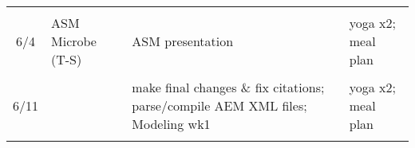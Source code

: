\documentclass[]{article}
\begin{document}
\begin{longtable}[]{@{}clll@{}}
\begin{minipage}[t]{0.24\columnwidth}
\strut
\end{minipage} & \begin{minipage}[t]{0.33\columnwidth}\raggedright\strut
\strut
\end{minipage} & \begin{minipage}[t]{0.28\columnwidth}\raggedright\strut
\strut
\end{minipage}\tabularnewline
\begin{minipage}[t]{0.04\columnwidth}\centering\strut
6/4\strut
\end{minipage} & \begin{minipage}[t]{0.24\columnwidth}\raggedright\strut
ASM Microbe (T-S)\strut
\end{minipage} & \begin{minipage}[t]{0.33\columnwidth}\raggedright\strut
ASM presentation\strut
\end{minipage} & \begin{minipage}[t]{0.28\columnwidth}\raggedright\strut
yoga x2; meal plan\strut
\end{minipage}\tabularnewline
\begin{minipage}[t]{0.04\columnwidth}\centering\strut
\strut
\end{minipage} & \begin{minipage}[t]{0.24\columnwidth}\raggedright\strut
\strut
\end{minipage} & \begin{minipage}[t]{0.33\columnwidth}\raggedright\strut
\strut
\end{minipage} & \begin{minipage}[t]{0.28\columnwidth}\raggedright\strut
\strut
\end{minipage}\tabularnewline
\begin{minipage}[t]{0.04\columnwidth}\centering\strut
6/11\strut
\end{minipage} & \begin{minipage}[t]{0.24\columnwidth}\raggedright\strut
\strut
\end{minipage} & \begin{minipage}[t]{0.33\columnwidth}\raggedright\strut
make final changes \& fix citations; parse/compile AEM XML files;
Modeling wk1\strut
\end{minipage} & \begin{minipage}[t]{0.28\columnwidth}\raggedright\strut
yoga x2; meal plan\strut
\end{minipage}\tabularnewline
\begin{minipage}[t]{0.04\columnwidth}\centering\strut
\strut

\end{minipage}
\end{longtable}
\end{document}
